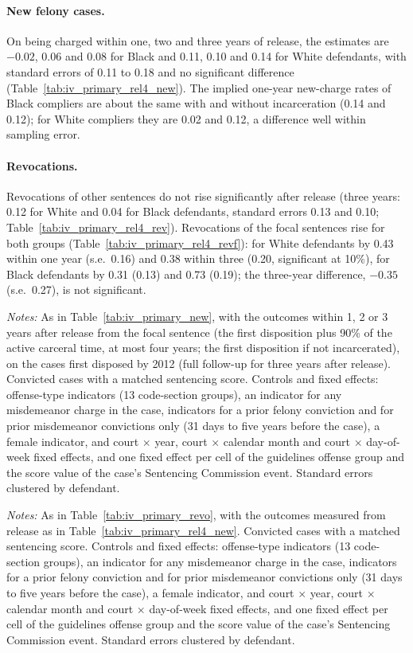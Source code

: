 \documentclass[11pt]{article}
\newcommand{\tabnote}[1]{\par\vspace{0.6ex}\begin{minipage}{\linewidth}\linespread{1}\footnotesize\textit{Notes:} #1\end{minipage}}
\newcommand{\controlsnote}{offense-type indicators (13 code-section groups), an indicator for any misdemeanor charge in the case, indicators for a prior felony conviction and for prior misdemeanor convictions only (31 days to five years before the case), a female indicator, and court $\times$ year, court $\times$ calendar month and court $\times$ day-of-week fixed effects}
\newcommand{\specnoteprim}{Convicted cases with a matched sentencing score. Controls and fixed effects: \controlsnote, and one fixed effect per cell of the guidelines offense group and the score value of the case's Sentencing Commission event. Standard errors clustered by defendant.}
\begin{document}
\paragraph{New felony cases.} On being charged within one, two and three years of release, the estimates are $-0.02$, 0.06 and 0.08 for Black and 0.11, 0.10 and 0.14 for White defendants, with standard errors of 0.11 to 0.18 and no significant difference (Table~\ref{tab:iv_primary_rel4_new}). The implied one-year new-charge rates of Black compliers are about the same with and without incarceration (0.14 and 0.12); for White compliers they are 0.02 and 0.12, a difference well within sampling error.

\paragraph{Revocations.} Revocations of other sentences do not rise significantly after release (three years: 0.12 for White and 0.04 for Black defendants, standard errors 0.13 and 0.10; Table~\ref{tab:iv_primary_rel4_rev}). Revocations of the focal sentences rise for both groups (Table~\ref{tab:iv_primary_rel4_revf}): for White defendants by 0.43 within one year (s.e.\ 0.16) and 0.38 within three (0.20, significant at 10\%), for Black defendants by 0.31 (0.13) and 0.73 (0.19); the three-year difference, $-0.35$ (s.e.\ 0.27), is not significant.

\begin{table}[H]
\centering
\caption{2SLS from release, time served at most four years: new felony cases}\label{tab:iv_primary_rel4_new}
{\small\linespread{1}\selectfont\renewcommand{\arraystretch}{0.9}}
\tabnote{As in Table~\ref{tab:iv_primary_new}, with the outcomes within 1, 2 or 3 years after release from the focal sentence (the first disposition plus 90\% of the active carceral time, at most four years; the first disposition if not incarcerated), on the cases first disposed by 2012 (full follow-up for three years after release). \specnoteprim}
\end{table}

\begin{table}[H]
\centering
\caption{2SLS from release, time served at most four years: revocations of other sentences}\label{tab:iv_primary_rel4_rev}
{\small\linespread{1}\selectfont\renewcommand{\arraystretch}{0.9}}
\tabnote{As in Table~\ref{tab:iv_primary_revo}, with the outcomes measured from release as in Table~\ref{tab:iv_primary_rel4_new}. \specnoteprim}
\end{table}
\end{document}
